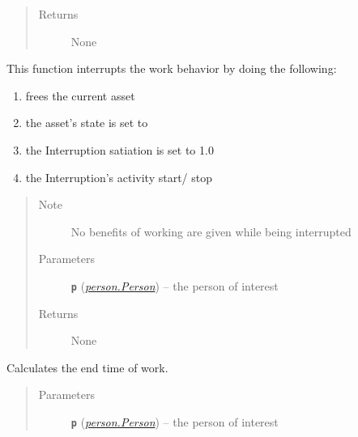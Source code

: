 \documentclass[letterpaper,10pt,english]{sphinxmanual}
\begin{document}
\begin{fulllineitems}
\begin{fulllineitems}
\begin{quote}
\begin{description}
\item[{Returns}] \leavevmode
None

\end{description}\end{quote}

\end{fulllineitems}


\begin{fulllineitems}
\label{work:work.Work.halt_work}
This function interrupts the work behavior by doing the following:
\begin{enumerate}
\item {} 
frees the current asset

\item {} 
the asset's state is set to 

\item {} 
the Interruption satiation is set to 1.0

\item {} 
the Interruption's activity start/ stop

\end{enumerate}
\begin{quote}\begin{description}
\item[{Note}] \leavevmode
No benefits of working are given while being interrupted

\item[{Parameters}] \leavevmode
\textbf{\texttt{p}} ({\hyperref[person:person.Person]{\emph{\emph{person.Person}}}}) -- the person of interest

\item[{Returns}] \leavevmode
None

\end{description}\end{quote}

\end{fulllineitems}


\begin{fulllineitems}
\label{work:work.Work.set_end_time}
Calculates the end time of work.
\begin{quote}\begin{description}
\item[{Parameters}] \leavevmode
\textbf{\texttt{p}} ({\hyperref[person:person.Person]{\emph{\emph{person.Person}}}}) -- the person of interest


\end{description}
\end{quote}
\end{fulllineitems}
\end{fulllineitems}
\end{document}
